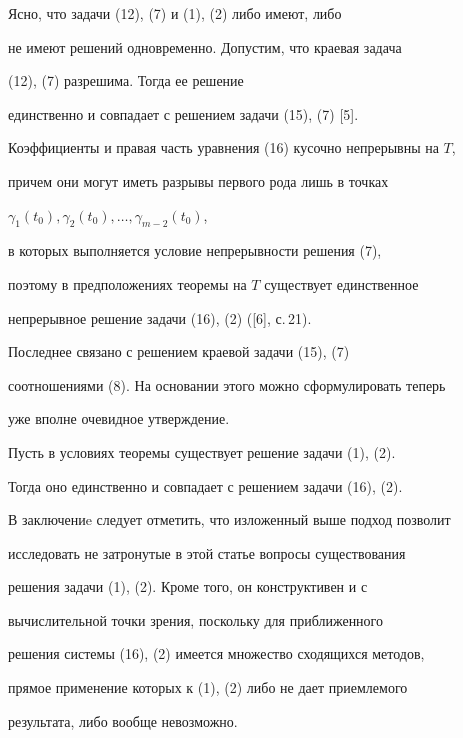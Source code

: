 Ясно, что задачи (12), (7) и (1), (2) либо имеют, либо 


не имеют решений одновременно. Допустим, что краевая задача


(12), (7) разрешима. Тогда ее решение


единственно и совпадает с решением задачи (15), (7) [5].


Коэффициенты и правая часть уравнения (16) кусочно непрерывны на $T$,


причем они могут иметь разрывы первого рода лишь в точках


$\gamma_1 (t_0),\gamma_2(t_0),\dotsc,\gamma_{m-2}(t_0)$, 


в которых выполняется условие непрерывности решения (7),


поэтому в предположениях теоремы на $T$ существует единственное


непрерывное решение задачи (16), (2) ([6], с.\,21). 


Последнее связано с решением краевой задачи (15), (7)


соотношениями (8). На основании этого можно сформулировать теперь


уже вполне очевидное утверждение.





\begin{cor}


Пусть в условиях теоремы существует решение задачи (1), (2).


Тогда оно единственно и совпадает с решением задачи (16), (2). 


\end{cor}





В заключениe следует отметить, что изложенный выше подход позволит 


исследовать не затронутые в этой статье вопросы существования


решения задачи (1), (2). Кроме того, он конструктивен и с 


вычислительной точки зрения, поскольку для приближенного


решения системы (16), (2) имеется множество сходящихся методов, 


прямое применение которых к (1), (2) либо не дает приемлемого


результата, либо вообще невозможно.








